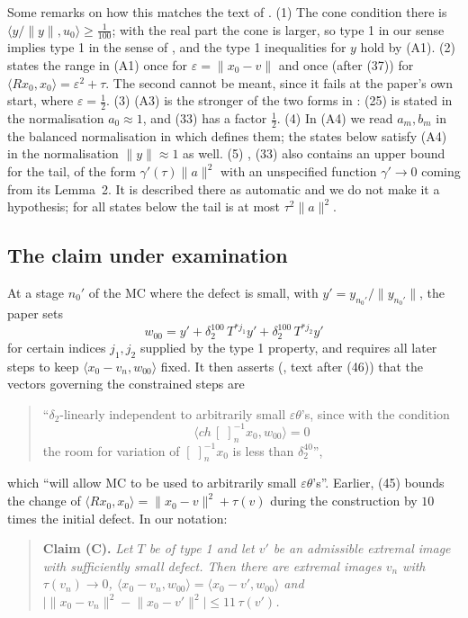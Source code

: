\documentclass[11pt]{article}
\theoremstyle{definition}
\newcommand{\ip}[2]{\langle #1,#2\rangle}
\newcommand{\norm}[1]{\lVert #1\rVert}
\begin{document}
Some remarks on how this matches the text of \cite{E}. (1) The cone condition there is
$\ip{y/\norm y}{u_0}\ge\frac1{100}$; with the real part the cone is larger, so type 1 in
our sense implies type 1 in the sense of \cite{E}, and the type 1 inequalities for $y$ hold
by (A1). (2) \cite{E} states the range in (A1) once for $\varepsilon=\norm{x_0-v}$ and once
(after (37)) for $\ip{Rx_0}{x_0}=\varepsilon^2+\tau$. The second cannot be meant, since it
fails at the paper's own start, where $\varepsilon=\frac12$. (3) (A3) is the stronger of the
two forms in \cite{E}: (25) is stated in the normalisation $a_0\approx1$, and (33) has a
factor $\frac12$. (4) In (A4) we read $a_m,b_m$ in the balanced normalisation in which
\cite{E} defines them; the states below satisfy (A4) in the normalisation $\norm y\approx1$
as well. (5) \cite{E}, (33) also contains an upper bound for the tail, of the form
$\gamma'(\tau)\norm a^2$ with an unspecified function $\gamma'\to0$ coming from its
Lemma~2. It is described there as automatic and we do not make it a hypothesis; for all
states below the tail is at most $\tau^2\norm a^2$.

\subsection*{The claim under examination}
At a stage $n_0'$ of the MC where the defect is small, with $y'=y_{n_0'}/\norm{y_{n_0'}}$, the
paper sets
\[
w_{00}=y'+\delta_2^{100}\,T^{*j_1}y'+\delta_2^{100}\,T^{*j_2}y'
\]
for certain indices $j_1,j_2$ supplied by the type 1 property, and requires all later steps to
keep $\ip{x_0-v_n}{w_{00}}$ fixed. It then asserts (\cite{E}, text after (46)) that the vectors
governing the constrained steps are
\begin{quote}
``$\delta_2$-linearly independent to arbitrarily small $\varepsilon\theta$'s, since with
the condition
\[\langle ch\,[\;]^{-1}_nx_0,w_{00}\rangle=0\]
the room for variation of $[\;]^{-1}_nx_0$ is less than $\delta_2^{40}$'',
\end{quote}
which ``will allow MC to be used to arbitrarily small $\varepsilon\theta$'s''. Earlier,
\cite{E} (45) bounds the change of $\ip{Rx_0}{x_0}=\norm{x_0-v}^2+\tau(v)$ during the
construction by $10$ times the initial defect. In our notation:

\begin{quote}
\textbf{Claim (C).} \emph{Let $T$ be of type 1 and let $v'$ be an admissible extremal image
with sufficiently small defect. Then there are extremal images $v_n$ with $\tau(v_n)\to0$,
$\ip{x_0-v_n}{w_{00}}=\ip{x_0-v'}{w_{00}}$ and
$\bigl|\norm{x_0-v_n}^2-\norm{x_0-v'}^2\bigr|\le11\,\tau(v')$.}
\end{quote}
\end{document}
